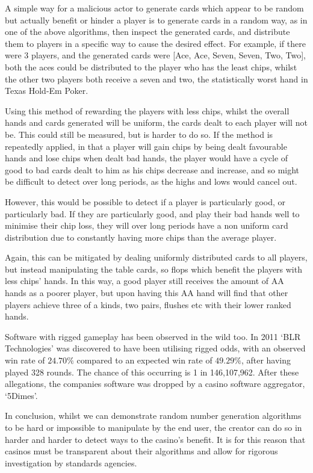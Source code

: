 A simple way for a malicious actor to generate cards which appear to be random
but actually benefit or hinder a player is to generate cards in a random
way, as in one of the above algorithms, then inspect the generated cards,
and distribute them to players in a specific way to cause the desired effect.
For example, if there were 3 players, and the generated cards were
[Ace, Ace, Seven, Seven, Two, Two], both the aces could be distributed to
the player who has the least chips, whilst the other two players both receive
a seven and two, the statistically worst hand in Texas Hold-Em Poker.

Using this method of rewarding the players with less chips, whilst the overall 
hands and cards generated will be uniform, the cards dealt to each player 
will not be. This could still be measured, but is harder to do so. If the
method is repeatedly applied, in that a player will gain chips by being dealt 
favourable hands and lose chips when dealt bad hands, the player would have 
a cycle of good to bad cards dealt to him as his chips decrease and increase, 
and so might be difficult to detect over long periods, as the highs and lows 
would cancel out.

However, this would be possible to detect if a player is particularly good, or
particularly bad. If they are particularly good, and play their bad hands well
to minimise their chip loss, they will over long periods have a non uniform
card distribution due to constantly having more chips than the average player.

Again, this can be mitigated by dealing uniformly distributed cards to all
players, but instead manipulating the table cards, so flops which benefit
the players with less chips' hands. In this way, a good player still receives
the amount of AA hands as a poorer player, but upon having this AA hand will
find that other players achieve three of a kinds, two pairs, flushes etc
with their lower ranked hands.

Software with rigged gameplay has been observed in the wild too. In 2011 
`BLR Technologies' was discovered to have been utilising rigged odds, with an 
observed win rate of $24.70\%$ compared to an expected win rate of $49.29\%$,
after having played 328 rounds. The chance of this occurring is 1 in 
146,107,962. \parencite{website:shackleford2011} After these allegations, 
the companies software was dropped by a casino software aggregator, `5Dimes'.

In conclusion, whilst we can demonstrate random number generation algorithms
to be hard or impossible to manipulate by the end user, the creator can do so
in harder and harder to detect ways to the casino's benefit. It is for this
reason that casinos must be transparent about their algorithms and allow
for rigorous investigation by standards agencies.
